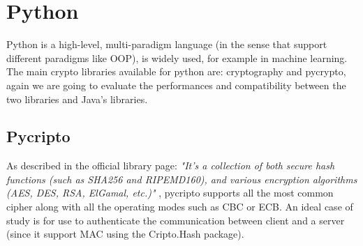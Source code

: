 \documentclass{article}
\begin{document}
\section{Python}
Python is a high-level, multi-paradigm language (in the sense that support different paradigms like OOP), is widely used, for example in machine learning.\\
The main crypto libraries available for python are: cryptography and pycrypto, again we are going to evaluate the performances and compatibility between the two libraries and Java's libraries.

\subsection{Pycripto}
As described in the official library page: \textit{"It's a collection of both secure hash functions (such as SHA256 and RIPEMD160), and various encryption algorithms (AES, DES, RSA, ElGamal, etc.)"} , pycripto supports all the most common cipher along with all the operating modes such as CBC or ECB.
An ideal case of study is for use to authenticate the communication between client and a server (since it support MAC using the Cripto.Hash package).
\end{document}
